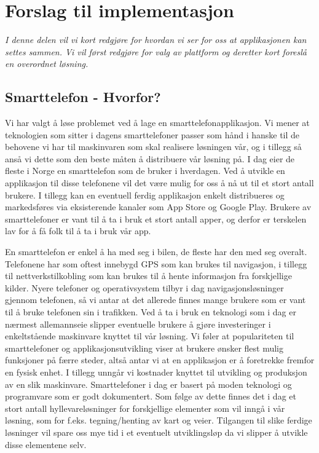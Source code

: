 \documentclass[a4paper,norsk,oneside]{book}
\begin{document}
\chapter{Forslag til implementasjon}
\label{cha:implementasjon}

{\it I denne delen vil vi kort redgjøre for hvordan vi ser for oss at applikasjonen kan settes sammen. Vi vil først redgjøre for valg av plattform og deretter kort foreslå en overordnet løsning.}

\section{Smarttelefon - Hvorfor?}
\label{sec:smarttelefon}

Vi har valgt å løse problemet ved å lage en smarttelefonapplikasjon. Vi mener at teknologien som sitter i dagens smarttelefoner passer som hånd i hanske til de behovene vi har til maskinvaren som skal realisere løsningen vår, og i tillegg så anså vi dette som den beste måten å distribuere vår løsning på. I dag eier de fleste i Norge en smarttelefon som de bruker i hverdagen. Ved å utvikle en applikasjon til disse telefonene vil det være mulig for oss å nå ut til et stort antall brukere. I tillegg kan en eventuell ferdig applikasjon enkelt distribueres og markedsføres via eksisterende kanaler som App Store og Google Play. Brukere av smarttelefoner er vant til å ta i bruk et stort antall apper, og derfor er terskelen lav for å få folk til å ta i bruk vår app.

En smarttelefon er enkel å ha med seg i bilen, de fleste har den med seg overalt. Telefonene har som oftest innebygd GPS som kan brukes til navigasjon, i tillegg til nettverkstilkobling som kan brukes til å hente informasjon fra forskjellige kilder. Nyere telefoner og operativsystem tilbyr i dag navigasjonsløsninger gjennom telefonen, så vi antar at det allerede finnes mange brukere som er vant til å bruke telefonen sin i trafikken. Ved å ta i bruk en teknologi som i dag er nærmest allemannseie slipper eventuelle brukere å gjøre investeringer i enkeltstående maskinvare knyttet til vår løsning. Vi føler at populariteten til smarttelefoner og applikasjonsutvikling viser at brukere ønsker flest mulig funksjoner på færre steder, altså antar vi at en applikasjon er å foretrekke fremfor en fysisk enhet. I tillegg unngår vi kostnader knyttet til utvikling og produksjon av en slik maskinvare. Smarttelefoner i dag er basert på moden teknologi og programvare som er godt dokumentert. Som følge av dette finnes det i dag et stort antall hyllevareløsninger for forskjellige elementer som vil inngå i vår løsning, som for f.eks. tegning/henting av kart og veier. Tilgangen til slike ferdige løsninger vil spare oss mye tid i et eventuelt utviklingsløp da vi slipper å utvikle disse elementene selv.
\end{document}
